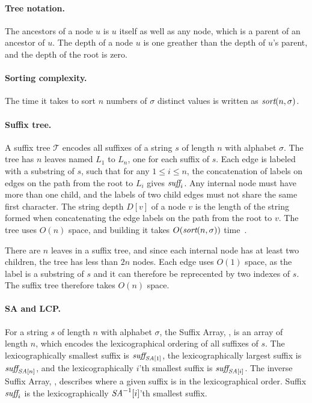 \documentclass[a4]{article}
\begin{document}
\paragraph{Tree notation.}
The ancestors of a node $u$ is $u$ itself as well as any node, which is a parent of an ancestor of $u$. The depth of a node $u$ is one greather than the depth of $u$'s parent, and the depth of the root is zero.

\paragraph{Sorting complexity.} The time it takes to sort $n$ numbers of $\sigma$ distinct values is written as $\textit{sort}(n,\sigma)$.

\paragraph{Suffix tree.} A suffix tree $\mathcal{T}$ encodes all suffixes of a string $s$ of length $n$ with alphabet $\sigma$. The tree has $n$ leaves named $L_1$ to $L_n$, one for each suffix of $s$. Each edge is labeled with a substring of $s$, such that for any $1\leq i\leq n$, the concatenation of labels on edges on the path from the root to $L_i$ gives $\textit{suff}_i$. Any internal node must have more than one child, and the labels of two child edges must not share the same first character. The string depth $D[v]$ of a node $v$ is the length of the string formed when concatenating the edge labels on the path from the root to $v$.
The tree uses $O(n)$ space, and building it takes $O(\textit{sort}(n,\sigma))$ time~\cite{sort-complexity}.

\ifreport

There are $n$ leaves in a suffix tree, and since each internal node has at least two children, the tree has less than $2n$ nodes. Each edge uses $O(1)$ space, as the label is a substring of $s$ and it can therefore be reprecented by two indexes of $s$. The suffix tree therefore takes $O(n)$ space.

\fi %

\paragraph{SA and LCP.} For a string $s$ of length $n$ with alphabet $\sigma$, the Suffix Array, \SA, is an array of length $n$, which encodes the lexicographical ordering of all suffixes of $s$. The lexicographically smallest suffix is $\textit{suff}_{\textit{SA}[1]}$, the lexicographically largest suffix is $\textit{suff}_{\textit{SA}[n]}$, and the lexicographically $i$'th smallest suffix is $\textit{suff}_{\textit{SA}[i]}$. The inverse Suffix Array, \SAi, describes where a given suffix is in the lexicographical order. Suffix $\textit{suff}_i$ is the lexicographically $\textit{SA}^{-1}[i]$'th smallest suffix.
\end{document}
